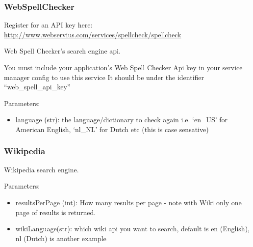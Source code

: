\documentclass[letterpaper,10pt,english]{sphinxmanual}
\begin{document}
\subsubsection{WebSpellChecker}
\label{api3.0:webspellchecker}
Register for an API key here: \href{http://www.webservius.com/services/spellcheck/spellcheck}{http://www.webservius.com/services/spellcheck/spellcheck}

\begin{fulllineitems}
\label{api3.0:puppy.search.engine.WebSpellChecker}
Web Spell Checker's search engine api.

You must include your application's Web Spell Checker Api key in your service manager config to use this service
It should be under the identifier ``web\_spell\_api\_key''

Parameters:
\begin{itemize}
\item {} 
language (str): the language/dictionary to check again i.e. `en\_US' for American English, `nl\_NL' for Dutch etc (this is case sensative)

\end{itemize}

\end{fulllineitems}



\subsubsection{Wikipedia}
\label{api3.0:wikipedia}

\begin{fulllineitems}
\label{api3.0:puppy.search.engine.Wikipedia}
Wikipedia search engine.

Parameters:
\begin{itemize}
\item {} 
resultsPerPage (int): How many results per page - note with Wiki only one page of results is returned.

\item {} 
wikiLanguage(str): which wiki api you want to search, default is en (English), nl (Dutch) is another example

\end{itemize}

\end{fulllineitems}
\end{document}
